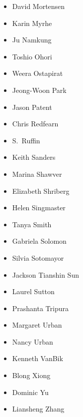 \begin{multicols}{3}
\begin{itemize}
\item David Mortensen
\item Karin Myrhe
\item Ju Namkung
\item Toshio Ohori
\item Weera Ostapirat
\item Jeong-Woon Park
\item Jason Patent
\item Chris Redfearn
\item S.\ Ruffin
\item Keith Sanders
\item Marina Shawver
\item Elizabeth Shriberg
\item Helen Singmaster
\item Tanya Smith
\item Gabriela Solomon
\item Silvia Sotomayor
\item Jackson Tianshin Sun
\item Laurel Sutton
\item Prashanta Tripura
\item Margaret Urban
\item Nancy Urban
\item Kenneth VanBik
\item Blong Xiong
\item Dominic Yu
\item Liansheng Zhang
\end{itemize}
\end{multicols}